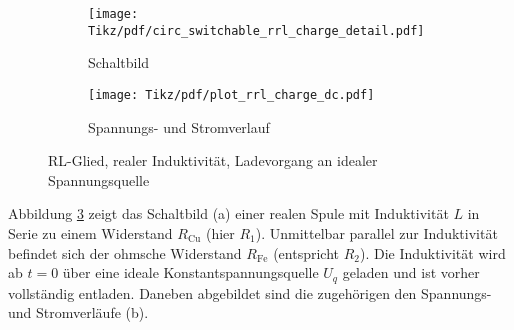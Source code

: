 \begin{frame}[t]
{    \begin{figure}[H]\centering
        \begin{subfigure}{0.48\textwidth}\centering
            \texttt{[image: Tikz/pdf/circ\_switchable\_rrl\_charge\_detail.pdf]}
            \caption{Schaltbild}
            \label{fig:circ:rl:charge}
        \end{subfigure}
        \begin{subfigure}{0.48\textwidth}\centering
            \texttt{[image: Tikz/pdf/plot\_rrl\_charge\_dc.pdf]}
            \caption{Spannungs- und Stromverlauf}
            \label{fig:plot:rl:charge}
        \end{subfigure}
        \caption{RL-Glied, realer Induktivität, Ladevorgang an idealer Spannungsquelle}
        \label{fig:rrl:charge}
    \end{figure}

    Abbildung \ref{fig:rrl:charge} zeigt das Schaltbild (a) einer realen Spule mit Induktivität $L$ in Serie zu einem Widerstand $R_{\text{Cu}}$ (hier $R_1$).
    Unmittelbar parallel zur Induktivität befindet sich der ohmsche Widerstand $R_{\text{Fe}}$ (entspricht $R_2$).
    Die Induktivität wird ab $t=0$ über eine ideale Konstantspannungsquelle $U_q$ geladen und ist vorher vollständig entladen.
    Daneben abgebildet sind die zugehörigen den Spannungs- und Stromverläufe (b).

}
\end{frame}
